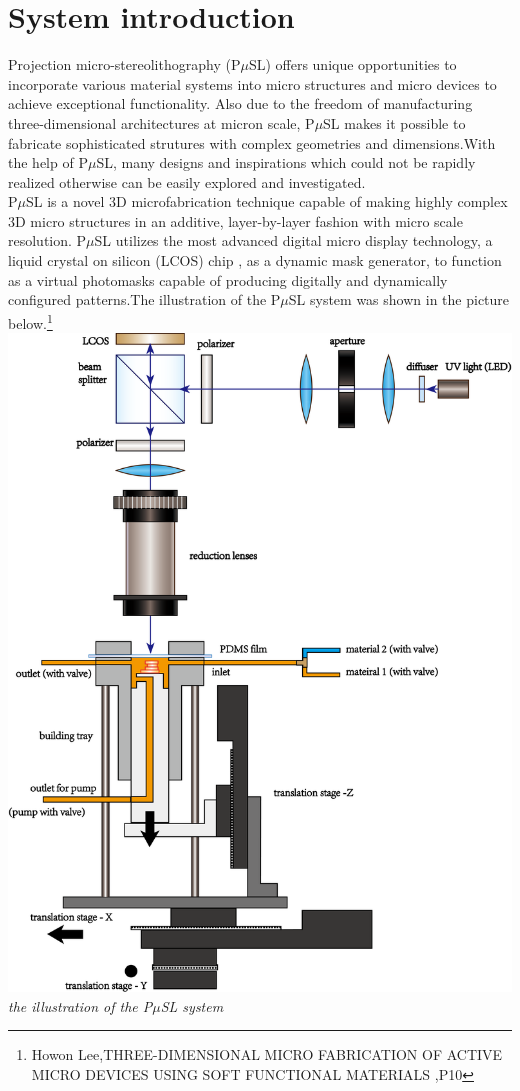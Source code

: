 \documentclass[a4paper]{article}
\begin{document}
\section{System introduction}
    Projection micro-stereolithography (P$\mu$SL) offers unique opportunities to incorporate various material systems into micro structures and micro devices to achieve exceptional functionality. Also due to the freedom of manufacturing three-dimensional architectures at micron scale, P$\mu$SL makes it possible to fabricate sophisticated strutures with complex geometries and dimensions.With the help of P$\mu$SL, many designs and inspirations which could not be rapidly realized otherwise can be easily explored and investigated.  \\
    \vspace{20pt}
    P$\mu$SL is a novel 3D microfabrication technique capable of making highly complex 3D micro structures in an additive, layer-by-layer fashion with micro scale resolution. P$\mu$SL utilizes the most advanced digital micro display technology, a liquid crystal on silicon (LCOS) chip , as a dynamic mask generator, to function as a virtual photomasks capable of producing digitally and dynamically configured patterns.The illustration of the P$\mu$SL system was shown in the picture below.\footnote{Howon Lee,THREE-DIMENSIONAL MICRO FABRICATION OF ACTIVE MICRO DEVICES USING SOFT FUNCTIONAL MATERIALS
,P10}\\
  \vspace{20pt}
    \centering
	\includegraphics[width=400pt]{overview.png}\\
	\textit{the illustration of the P$\mu$SL system}
    \pagebreak
    
\end{document}
